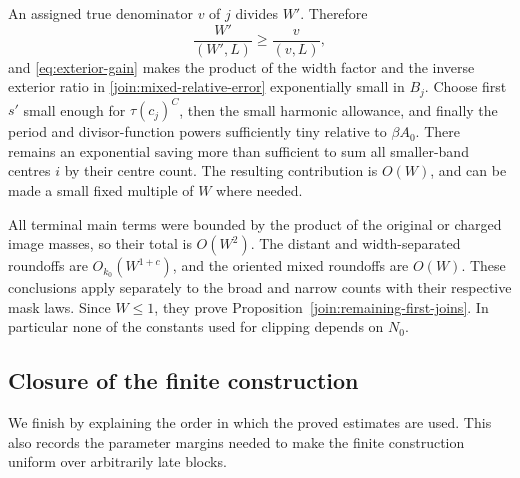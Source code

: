 An assigned true denominator $v$ of $j$ divides $W'$. Therefore
\[
 \frac{W'}{(W',L)}\ge \frac{v}{(v,L)},
\]
and \eqref{eq:exterior-gain} makes the product of the width factor
and the inverse exterior ratio in
\eqref{join:mixed-relative-error} exponentially small in $B_j$.
Choose first $s'$ small enough for $\tau(c_j)^C$, then the small
harmonic allowance, and finally the period and divisor-function
powers sufficiently tiny relative to $\beta A_0$. There remains an
exponential saving more than sufficient to sum all smaller-band
centres $i$ by their centre count. The resulting contribution is
$O(W)$, and can be made a small fixed multiple of $W$ where needed.

All terminal main terms were bounded by the product of the original or
charged image masses, so their total is $O(W^2)$. The distant and
width-separated roundoffs are $O_{k_0}(W^{1+c})$, and the oriented
mixed roundoffs are $O(W)$. These conclusions apply separately to
the broad and narrow counts with their respective mask laws. Since
$W\le1$, they prove Proposition~\ref{join:remaining-first-joins}.
In particular none of the constants used for clipping depends on
$N_0$.

\subsection{Closure of the finite construction}

We finish by explaining the order in which the proved estimates are
used. This also records the parameter margins needed to make the
finite construction uniform over arbitrarily late blocks.

